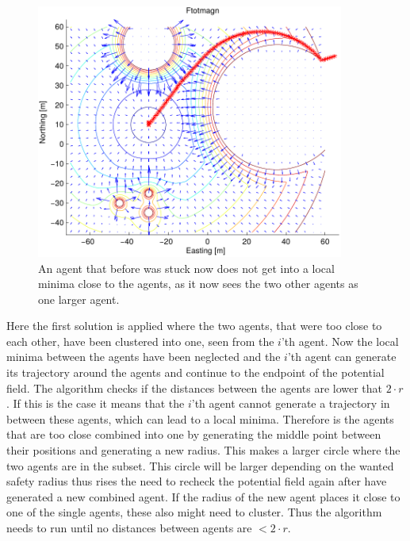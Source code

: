 \begin{figure}[htbp]
  \includegraphics[width=0.9\textwidth]{fig/ftotmagnfigpdf4}
  \caption{An agent that before was stuck now does not get into a local minima close to the agents, as it now sees the two other agents as one larger agent.}
  \label{fig:solroevproblem}
\end{figure}

Here the first solution is applied where the two agents, that were too close to each other, have been clustered into one, seen from the $i$'th agent. Now the local minima between the agents have been neglected and the $i$'th agent can generate its trajectory around the agents and continue to the endpoint of the potential field. The algorithm checks if the distances between the agents are lower that $2 \cdot r$. If this is the case it means that the $i$'th agent cannot generate a trajectory in between these agents, which can lead to a local minima. Therefore is the agents that are too close combined into one by generating the middle point between their positions and generating a new radius. This makes a larger circle where the two agents are in the subset. This circle will be larger depending on the wanted safety radius thus rises the need to recheck the potential field again after have generated a new combined agent. If the radius of the new agent places it close to one of the single agents, these also might need to cluster. Thus the algorithm needs to run until no distances between agents are $< 2 \cdot r$.

